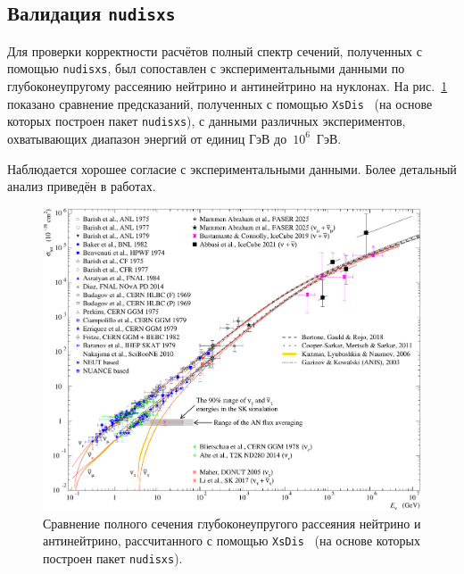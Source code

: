 \subsection{Валидация \texttt{nudisxs}}

Для проверки корректности расчётов полный спектр сечений, полученных с помощью \texttt{nudisxs}, был сопоставлен с экспериментальными данными по глубоконеупругому рассеянию нейтрино и антинейтрино на нуклонах. 
На рис.~\ref{fig:disxs_compare} показано сравнение предсказаний, полученных с помощью \texttt{XsDis}~\cite{kuzmin2006_finetuning,kuzmin2005_sumcc,kuzmin2006_axialmass} (на основе которых построен пакет \texttt{nudisxs}), с данными различных экспериментов, охватывающих диапазон энергий от единиц ГэВ до~$10^6$~ГэВ.

Наблюдается хорошее согласие с экспериментальными данными. Более детальный анализ приведён в работах\cite{kuzmin2006_finetuning,kuzmin2005_sumcc,kuzmin2006_axialmass}.

\begin{figure}[!h]
\centering
\includegraphics[width=\linewidth]{images/dis_vs_data.pdf}
\caption{Сравнение полного сечения глубоконеупругого рассеяния нейтрино и антинейтрино, рассчитанного с помощью \texttt{XsDis}~\cite{kuzmin2006_finetuning,kuzmin2005_sumcc,kuzmin2006_axialmass} (на основе которых построен пакет \texttt{nudisxs}).}
\label{fig:disxs_compare}
\end{figure}

